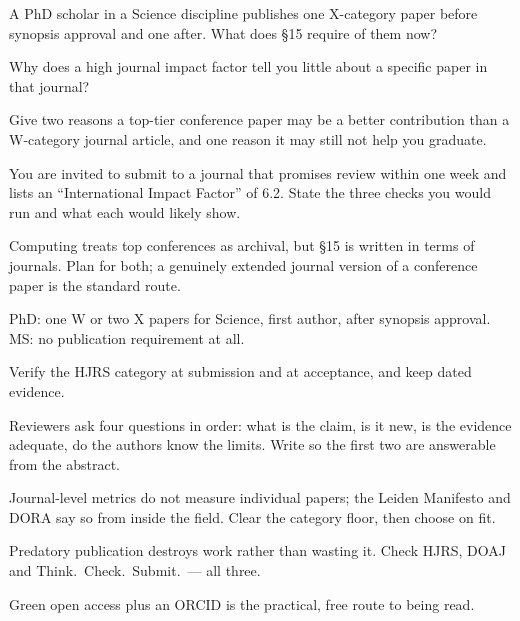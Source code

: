 \begin{checkpoint}
\begin{tightnum}
  \item A PhD scholar in a Science discipline publishes one X-category paper
    before synopsis approval and one after. What does \S15 require of them now?
  \item Why does a high journal impact factor tell you little about a specific
    paper in that journal?
  \item Give two reasons a top-tier conference paper may be a better
    contribution than a W-category journal article, and one reason it may still
    not help you graduate.
  \item You are invited to submit to a journal that promises review within one
    week and lists an ``International Impact Factor'' of 6.2. State the three
    checks you would run and what each would likely show.
\end{tightnum}
\end{checkpoint}

\begin{chaptersummary}
\begin{tight}
  \item Computing treats top conferences as archival, but \S15 is written in
    terms of journals. Plan for both; a genuinely extended journal version of a
    conference paper is the standard route.
  \item PhD: one W or two X papers for Science, first author, after synopsis
    approval. MS: no publication requirement at all.
  \item Verify the HJRS category at submission and at acceptance, and keep
    dated evidence.
  \item Reviewers ask four questions in order: what is the claim, is it new, is
    the evidence adequate, do the authors know the limits. Write so the first
    two are answerable from the abstract.
  \item Journal-level metrics do not measure individual papers; the Leiden
    Manifesto and DORA say so from inside the field. Clear the category floor,
    then choose on fit.
  \item Predatory publication destroys work rather than wasting it. Check HJRS,
    DOAJ and Think.\ Check.\ Submit.\ --- all three.
  \item Green open access plus an ORCID is the practical, free route to being
    read.
\end{tight}
\end{chaptersummary}

